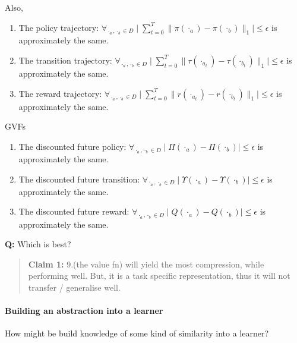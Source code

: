 Also,

\begin{enumerate}
\def\labelenumi{\arabic{enumi}.}
\setcounter{enumi}{3}
\tightlist
\item
  The policy trajectory:
  \(\forall_{\cdot_a, \cdot_b \in D} \mid \sum_{t=0}^T \parallel \pi(\cdot_a) - \pi(\cdot_b)\parallel_1 \mid \le \epsilon\)
  is approximately the same.
\item
  The transition trajectory:
  \(\forall_{\cdot_a, \cdot_b \in D} \mid \sum_{t=0}^T\parallel \tau(\cdot_{a_t}) - \tau(\cdot_{b_t})\parallel_1\mid \le \epsilon\)
  is approximately the same.
\item
  The reward trajectory:
  \(\forall_{\cdot_a, \cdot_b \in D} \mid \sum_{t=0}^T \parallel r(\cdot_{a_t}) - r(\cdot_{b_t})\parallel_1 \mid \le \epsilon\)
  is approximately the same.
\end{enumerate}

GVFs

\begin{enumerate}
\def\labelenumi{\arabic{enumi}.}
\setcounter{enumi}{6}
\tightlist
\item
  The discounted future policy:
  \(\forall_{\cdot_a, \cdot_b \in D} \mid \Pi(\cdot_a) - \Pi(\cdot_b)\mid \le \epsilon\)
  is approximately the same.
\item
  The discounted future transition:
  \(\forall_{\cdot_a, \cdot_b \in D} \mid \Upsilon(\cdot_a) - \Upsilon (\cdot_b)\mid \le \epsilon\)
  is approximately the same.
\item
  The discounted future reward:
  \(\forall_{\cdot_a, \cdot_b \in D} \mid Q(\cdot_a) - Q(\cdot_b)\mid \le \epsilon\)
  is approximately the same.
\end{enumerate}

\textbf{Q:} Which is best?

\begin{quote}
\textbf{Claim 1:} 9.(the value fn) will yield the most compression,
while performing well. But, it is a task specific representation, thus
it will not transfer / generalise well.
\end{quote}



\paragraph{Building an abstraction into a learner}

How might be build knowledge of some kind of similarity into a learner?

